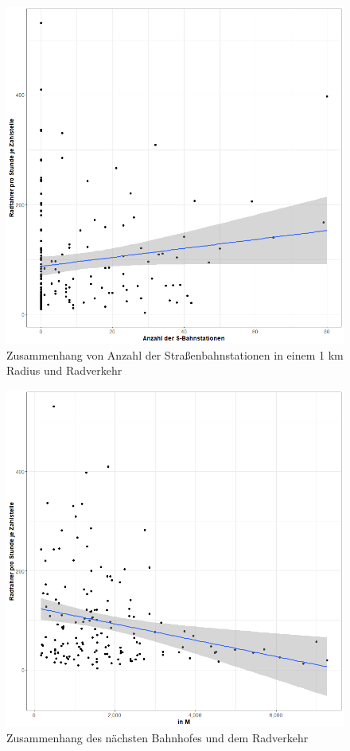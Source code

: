 \documentclass[a4paper,12pt]{thesis}
\begin{document}
\begin{figure}[!ht]
	\centering
	\includegraphics[width=\textwidth]{Plots/plot18.png}
	\caption{Zusammenhang von Anzahl der Straßenbahnstationen in einem 1 km Radius und Radverkehr}
	\label{Trams}
\end{figure}

\begin{figure}[!ht]
	\centering
	\includegraphics[width=\textwidth]{Plots/plot19.png}
	\caption{Zusammenhang des nächsten Bahnhofes und dem Radverkehr}
	\label{Train}
\end{figure}
\end{document}
